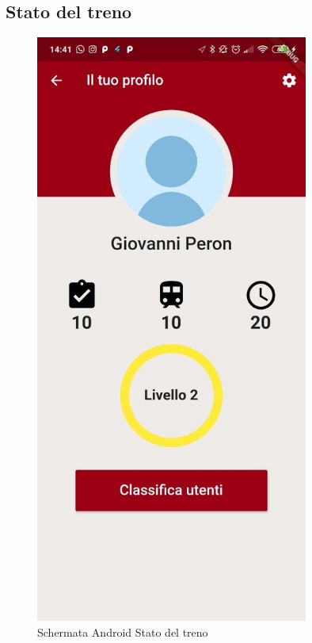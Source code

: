 \subsection{Stato del treno}
\vspace{-\parskip}
\begin{minipage}{0.45\textwidth}
	\begin{figure}[H]
		\centering
		\includegraphics[width=0.8\textwidth]{immagini/profile.jpg}
		\caption{Schermata Android Stato del treno}
	\end{figure}
\end{minipage}
